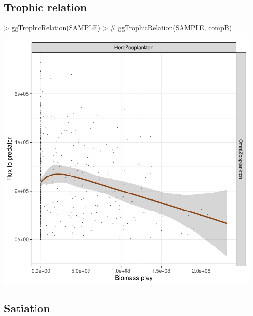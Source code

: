 \documentclass{article}
\begin{document}
\subsection{Trophic relation}

\begin{Schunk}
\begin{Sinput}
> ggTrophicRelation(SAMPLE)
> # ggTrophicRelation(SAMPLE, compB)
\end{Sinput}
\end{Schunk}
\includegraphics{barents_SM-021}

\subsection{Satiation}
\end{document}
